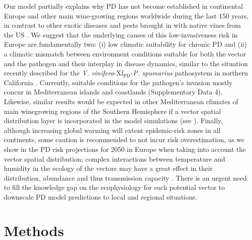     Our model partially explains why PD has not become established in
    continental
    Europe and other main wine-growing regions worldwide during the last 150
    years,
    in contrast to other exotic diseases and pests brought in with native vines
    from the US \cite{Borkarbook, Brewer2010, Rouxel2014, Tello2019}. We
    suggest
    that the underlying causes of this low-invasiveness risk in Europe are
    fundamentally two: (i) low climatic suitability for chronic PD and (ii) a
    climatic mismatch between environment conditions suitable for both the
    vector
    and the pathogen and their interplay in disease dynamics, similar to the
    situation recently described for the \textit{V.
        vinifera}-Xf$_{\textrm{PD}}$-{\textit{P. spumarius}} pathosystem in
    northern
    California \cite{Beal2021}. Currently, suitable conditions for the
    pathogen's
    invasion mostly concur in Mediterranean islands and coastlands
    (Supplementary
    Data 4). Likewise, similar results would be expected in other Mediterranean
    climates of main winegrowing regions of the Southern Hemisphere if a vector
    spatial distribution layer is incorporated in the model simulations (see
    \cite{Webpage}). Finally, although increasing global warming will extent
    epidemic-risk zones in all continents, some caution is recommended to not
    incur
    risk overestimation, as we show in the PD risk projections for 2050 in
    Europe
    when taking into account the vector spatial distribution; complex
    interactions
    between temperature and humidity in the ecology of the vectors may have a
    great
    effect in their distribution, abundance and thus transmission capacity
    \cite{Godefroid2021}. There is an urgent need to fill the knowledge gap on
    the
    ecophysiology for each potential vector to downscale PD model predictions
    to
    local and regional situations.

    \section{Methods}

